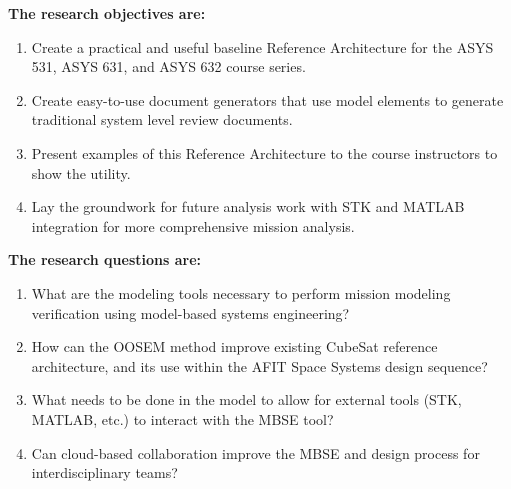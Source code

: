 
\noindent \textbf{The research objectives are:}

\begin{enumerate}
\item{Create a practical and useful baseline Reference Architecture for the ASYS 531, ASYS 631, and ASYS 632 course series.}
\item{Create easy-to-use document generators that use model elements to generate traditional system level review documents.}
\item{Present examples of this Reference Architecture to the course instructors to show the utility.}
\item{Lay the groundwork for future analysis work with STK and MATLAB integration for more comprehensive mission analysis.}
\end{enumerate}



\noindent \textbf{The research questions are:}

\begin{enumerate}
\item{What are the modeling tools necessary to perform mission modeling verification using model-based systems engineering?}
\item{How can the OOSEM method improve existing CubeSat reference architecture, and its use within the AFIT Space Systems design sequence?}
\item{What needs to be done in the model to allow for external tools (STK, MATLAB, etc.) to interact with the MBSE tool?}
\item{Can cloud-based collaboration improve the MBSE and design process for interdisciplinary teams?}

\end{enumerate}